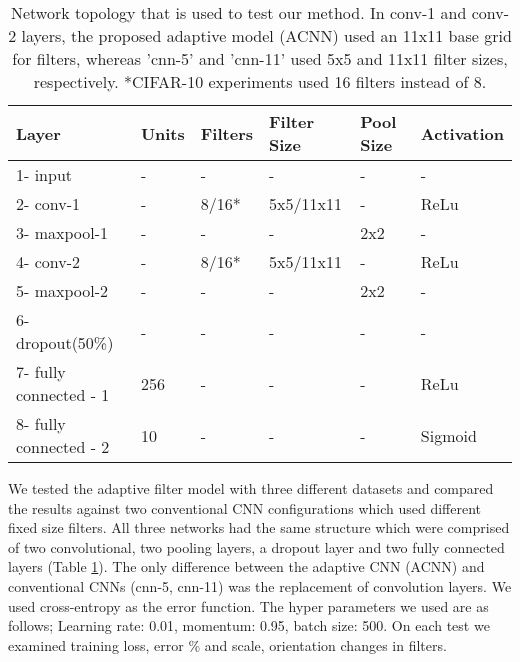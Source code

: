 \documentclass{bmvc2k}
\begin{document}
\begin{table}
\centering
\caption{Network topology that is used to test our method. In conv-1 and conv-2 layers, the proposed adaptive model (ACNN) used an 11x11 base grid for filters, whereas 'cnn-5' and 'cnn-11' used 5x5 and 11x11 filter sizes, respectively. *CIFAR-10 experiments used 16 filters instead of 8.}
\bigskip
\begin{tabular}{ | l | l | l | l | l | l |}
	\hline
	Layer & Units & Filters & Filter Size & Pool Size & Activation \\ \hline
	1- input & - & - & - & - & - \\ \hline
	2- conv-1 & - & 8/16* & 5x5/11x11 & - & ReLu \\ \hline
	3- maxpool-1 & - & - & - & 2x2 & - \\ \hline
	4- conv-2 & - & 8/16* & 5x5/11x11 & - & ReLu \\ \hline
	5- maxpool-2 & - & - & - & 2x2 & - \\ \hline
	6- dropout(50\%) & - & - & - & - & - \\ \hline
	7- fully connected - 1 & 256 & - & - & - & ReLu \\ \hline
	8- fully connected - 2 & 10 & - & - & - & Sigmoid \\ \hline
\end{tabular}
\label{table:network}

\end{table}


We tested the adaptive filter model with three different datasets and compared the results against two conventional CNN configurations which used different fixed size filters. All three networks had the same structure which were comprised of two convolutional, two pooling layers, a dropout layer and two fully connected layers (Table \ref{table:network}). The only difference between the adaptive CNN (ACNN) and conventional CNNs (cnn-5, cnn-11) was the replacement of convolution layers. We used cross-entropy as the error function.
The hyper parameters we used are as follows; Learning rate: 0.01, momentum: 0.95, batch size: 500. On each test we examined training loss, error \% and scale, orientation changes in filters. 
\end{document}
